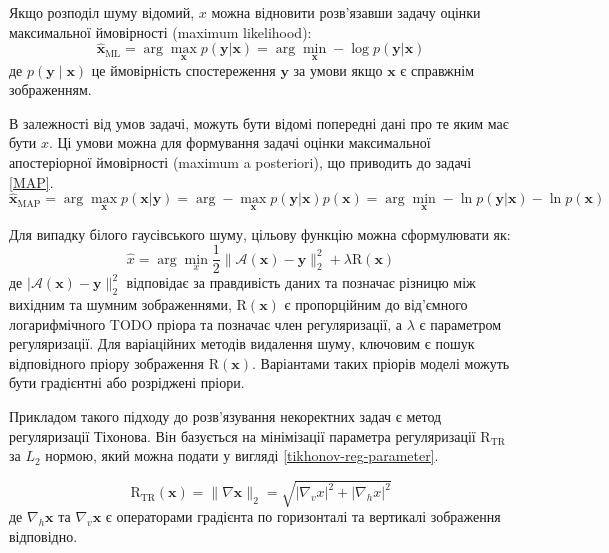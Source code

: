 \documentclass[14pt,a4paper]{extarticle}
\newcounter{e}
\numberwithin{equation}{section}
\numberwithin{figure}{section}
\begin{document}
	Якщо розподіл шуму відомий, $x$ можна відновити розв'язавши задачу оцінки максимальної ймовірності (maximum likelihood):
	\begin{equation}
		\hat{\boldsymbol{x}}_{\mathrm{ML}}
		= \arg \max_{\boldsymbol{x}} {p (\boldsymbol{y} | \boldsymbol{x})}
		= \arg \min_{\boldsymbol{x}} -\log p(\boldsymbol{y} | \boldsymbol{x})
	\end{equation}
	де $p(\boldsymbol{y} \mid \boldsymbol{x})$ це ймовірність спостереження $\boldsymbol{y}$ за умови якщо $\boldsymbol{x}$ є справжнім зображенням.
	
	В залежності від умов задачі, можуть бути відомі попередні дані про те яким має бути $x$. Ці умови можна для формування  задачі оцінки максимальної апостеріорної ймовірності (maximum a posteriori), що приводить до задачі \ref{MAP}.
	\begin{equation}
		\label{MAP}
		\hat{\boldsymbol{x}}_{\mathrm{MAP}}
		=
		\arg \max_{\boldsymbol{x}} p(\boldsymbol{x} | \boldsymbol{y}) 
		=
		\arg -\max_{\boldsymbol{x}} { p(\boldsymbol{y} | \boldsymbol{x})} p(\boldsymbol{x})
		=
		\arg \min_{\boldsymbol{x}} -\ln p(\boldsymbol{y} | \boldsymbol{x})-\ln p(\boldsymbol{x})
	\end{equation}
	
	Для випадку білого гаусівського шуму, цільову функцію можна сформулювати як:
	\begin{equation}
		\label{MAP-avgn}
		\hat{x}=\arg \min_{x} 	\frac{1}{2}\|\mathcal{A}(\boldsymbol{x})-\boldsymbol{y}\|_{2}^{2}+\lambda \mathrm{R}(\boldsymbol{x})
	\end{equation}
	де  $|\mathcal{A}(\boldsymbol{x})-\boldsymbol{y}\|_{2}^{2}$ відповідає за правдивість даних та позначає різницю між вихідним та шумним зображеннями, $\mathrm{R}(\boldsymbol{x})$ є пропорційним до від'ємного логарифмічного TODO пріора та позначає член регуляризації, а $\lambda$ є параметром регуляризації. Для варіаційних методів видалення шуму, ключовим є пошук відповідного пріору зображення $\mathrm{R}(\boldsymbol{x})$. Варіантами таких пріорів моделі можуть бути градієнтні або розріджені пріори.

	Прикладом такого підходу до розв'язування некоректних задач є метод регуляризації Тіхонова. Він базується на мінімізації параметра регуляризації $\mathrm{R}_{\mathrm{TR}}$ за $L_2$ нормою, який можна подати у вигляді \ref{tikhonov-reg-parameter}.
	
	\begin{equation}
		\label{tikhonov-reg-parameter}
		\mathrm{R}_{\mathrm{TR}}(\boldsymbol{x})
		=
		\|\nabla \boldsymbol{x}\|_{2} 
		=
		\sqrt{\left|\nabla_{v} x\right|^{2}+\left|\nabla_{h} x\right|^{2}}
	\end{equation}
	де $\nabla_{h} \boldsymbol{x}$ та $\nabla_{v} \boldsymbol{x}$ є операторами градієнта по горизонталі та вертикалі зображення відповідно.
	
\end{document}
